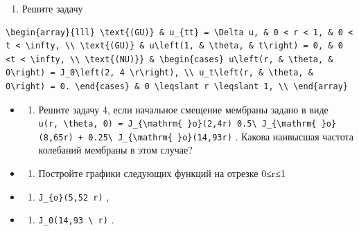 \documentclass[
  ukrainian,
]{article}
\providecommand{\tightlist}{%
  \setlength{\itemsep}{0pt}\setlength{\parskip}{0pt}}
\begin{document}
\begin{enumerate}
\def\labelenumi{\arabic{enumi}.}
\setcounter{enumi}{3}
\tightlist
\item
  Решите задачу
\end{enumerate}

\begin{verbatim}
\begin{array}{lll} \text{(GU)} & u_{tt} = \Delta u, & 0 < r < 1, & 0 < t < \infty, \\ \text{(GU)} & u\left(1, & \theta, & t\right) = 0, & 0 <t < \infty, \\ \text{(NU)}} & \begin{cases} u\left(r, & \theta, & 0\right) = J_0\left(2, 4 \r\right), \\ u_t\left(r, & \theta, & 0\right) = 0. \end{cases} & 0 \leqslant r \leqslant 1, \\ \end{array}
\end{verbatim}

\begin{itemize}
\tightlist
\item
  \begin{enumerate}
  \def\labelenumi{\arabic{enumi}.}
  \setcounter{enumi}{4}
  \tightlist
  \item
    Решите задачу 4, если начальное смещение мембраны задано в виде
    \texttt{u(r,\ \textbackslash{}theta,\ 0)\ =\ J\_\{\textbackslash{}mathrm\{\ \}o\}(2,4r)\ 0.5\textbackslash{}\ J\_\{\textbackslash{}mathrm\{\ \}o\}(8,65r)\ +\ 0.25\textbackslash{}\ J\_\{\textbackslash{}mathrm\{\ \}o\}(14,93r)}
    . Какова наивысшая частота колебаний мембраны в этом случае?
  \end{enumerate}
\item
  \begin{enumerate}
  \def\labelenumi{\arabic{enumi}.}
  \setcounter{enumi}{5}
  \tightlist
  \item
    Постройте графики следующих функций на отрезке 0≤r≤1
  \end{enumerate}
\item
  \begin{enumerate}
  \def\labelenumi{\alph{enumi})}
  \tightlist
  \item
    \texttt{J\_\{o\}(5,52\ r)} ,
  \end{enumerate}
\item
  \begin{enumerate}
  \def\labelenumi{\arabic{enumi})}
  \setcounter{enumi}{5}
  \tightlist
  \item
    \texttt{J\_0(14,93\ \textbackslash{}\ r)} .
  \end{enumerate}
\end{itemize}
\end{document}
